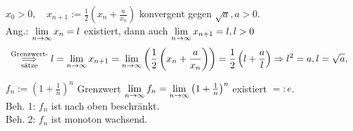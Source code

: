 \documentclass[../ana1.tex]{subfiles}
\begin{document}
\begin{bsp}[1]
	\(x_0 > 0, \quad x_{n+1} := \frac{1}{2} \left( x_n + \frac{a}{x_n} \right) \) konvergent gegen \(\sqrt{a}, a>0 \).\\
	Ang.: \( \lim\limits_{n\rightarrow\infty} x_n = l \) existiert, dann auch \( \lim\limits_{n\rightarrow\infty} x_{n+1} = l, l>0 \)
	\[ \overset{\text{Grenzwert-}}{\underset{\text{sätze}}{\Longrightarrow}} l = \lim\limits_{n\rightarrow\infty} x_{n+1} = \lim\limits_{n\rightarrow\infty} \left( \frac{1}{2} \left(x_n + \frac{a}{x_n} \right) \right) = \frac{1}{2} \left( l + \frac{a}{l} \right) \Rightarrow l^2 = a, l = \sqrt{a}. \]
\end{bsp}
\begin{bsp}[2]
	\(f_n := {\left( 1 + \frac{1}{n} \right)}^n \) Grenzwert \( \lim\limits_{n\rightarrow\infty} f_n = \lim\limits_{n\rightarrow\infty} {\left( 1 + \frac{1}{n} \right)}^n \) existiert \( =: e \).\\
	Beh. 1: \( f_n\) ist nach oben beschränkt.\\
	Beh. 2: \( f_n\) ist monoton wachsend.
\end{bsp}
\end{document}
